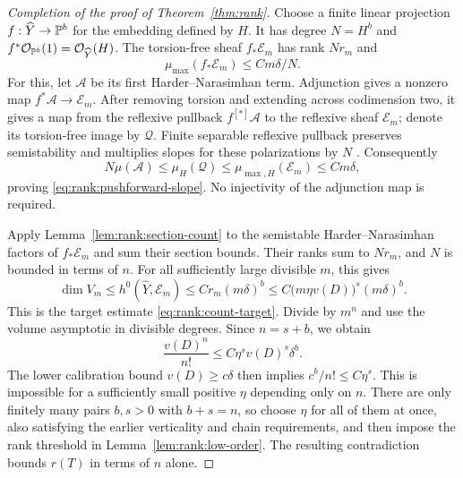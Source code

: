 \begin{proof}[Completion of the proof of Theorem~\ref{thm:rank}]
Choose a finite linear projection $f:\widehat Y\to\mathbb P^b$ for the
embedding defined by $H$.  It has degree $N=H^b$ and
$f^*\mathcal O_{\mathbb P^b}(1)=\mathcal O_{\widehat Y}(H)$.
The torsion-free sheaf $f_*\mathcal E_m$ has rank $Nr_m$ and
\begin{equation}\label{eq:rank:pushforward-slope}
  \mu_{\max}(f_*\mathcal E_m)\le Cm\delta/N.
\end{equation}
For this, let $\mathcal A$ be its first Harder--Narasimhan term.
Adjunction gives a nonzero map $f^*\mathcal A\to\mathcal E_m$.
After removing torsion and extending across codimension two, it gives
a map from the reflexive pullback $f^{[*]}\mathcal A$ to the reflexive
sheaf $\mathcal E_m$; denote its torsion-free image by $\mathcal Q$.
Finite separable reflexive pullback preserves semistability and
multiplies slopes for these polarizations by $N$
\cite[Lemma~2.1]{Weissmann2024}.
Consequently
\[
  N\mu(\mathcal A)
   \le\mu_H(\mathcal Q)
   \le\mu_{\max,H}(\mathcal E_m)
   \le Cm\delta,
\]
proving \eqref{eq:rank:pushforward-slope}.  No injectivity of the
adjunction map is required.

Apply Lemma~\ref{lem:rank:section-count} to the semistable
Harder--Narasimhan factors of $f_*\mathcal E_m$ and sum their section
bounds.  Their ranks sum to $Nr_m$, and $N$ is bounded in terms of $n$.
For all sufficiently large divisible $m$, this gives
\[
  \dim V_m\le h^0(\widehat Y,\mathcal E_m)
       \le Cr_m(m\delta)^b
       \le C\bigl(m\eta v(D)\bigr)^s(m\delta)^b.
\]
This is the target estimate \eqref{eq:rank:count-target}.
Divide by $m^n$ and use the volume asymptotic in divisible degrees.
Since $n=s+b$, we obtain
\[
  \frac{v(D)^n}{n!}\le C\eta^s v(D)^s\delta^b.
\]
The lower calibration bound $v(D)\ge c\delta$ then implies
$c^b/n!\le C\eta^s$.  This is impossible for a sufficiently small
positive $\eta$ depending only on $n$.  There are only finitely many
pairs $b,s>0$ with $b+s=n$, so choose $\eta$ for all of them at once,
also satisfying the earlier verticality and chain requirements, and
then impose the rank threshold in Lemma~\ref{lem:rank:low-order}.
The resulting contradiction bounds $r(T)$ in terms of $n$ alone.
\end{proof}
